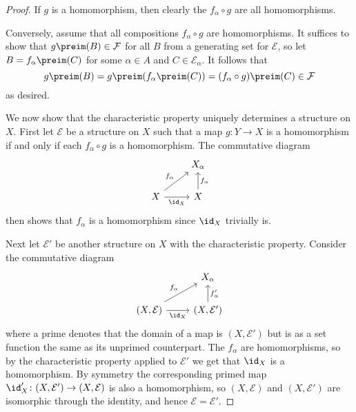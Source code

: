 \documentclass[article, a4paper, 11pt, oneside]{memoir}
\numberwithin{equation}{chapter}
\newcommand{\calE}{\mathcal{E}}
\newcommand{\calF}{\mathcal{F}}
\begin{document}
\begin{proof}
    If $g$ is a homomorphism, then clearly the $f_\alpha \circ g$ are all homomorphisms.

    Conversely, assume that all compositions $f_\alpha \circ g$ are homomorphisms. It suffices to show that $g\preim(B) \in \calF$ for all $B$ from a generating set for $\calE$, so let $B = f_\alpha\preim(C)$ for some $\alpha \in A$ and $C \in \calE_\alpha$. It follows that
    \begin{equation*}
        g\preim(B)
            = g\preim(f_\alpha\preim(C))
            = (f_\alpha \circ g)\preim(C)
            \in \calF
    \end{equation*}
    as desired.
    
    We now show that the characteristic property uniquely determines a structure on $X$. First let $\calE$ be a structure on $X$ such that a map $g \colon Y \to X$ is a homomorphism if and only if each $f_\alpha \circ g$ is a homomorphism. The commutative diagram
    \begin{equation*}
        \begin{tikzcd}
            & X_\alpha \\
            X
                \ar[r, "\id_X", swap]
                \ar[ur, "f_\alpha"]
            & X
                \ar[u, "f_\alpha", swap]
        \end{tikzcd}
    \end{equation*}
    then shows that $f_\alpha$ is a homomorphism since $\id_X$ trivially is.

    Next let $\calE'$ be another structure on $X$ with the characteristic property. Consider the commutative diagram
    \begin{equation*}
        \begin{tikzcd}
            & X_\alpha \\
            (X, \calE)
                \ar[r, "\id_X", swap]
                \ar[ur, "f_\alpha"]
            & (X, \calE')
                \ar[u, "f_\alpha'", swap]
        \end{tikzcd}
    \end{equation*}
    where a prime denotes that the domain of a map is $(X,\calE')$ but is as a set function the same as its unprimed counterpart. The $f_\alpha$ are homomorphisms, so by the characteristic property applied to $\calE'$ we get that $\id_X$ is a homomorphism. By symmetry the corresponding primed map $\id_X' \colon (X, \calE') \to (X, \calE)$ is also a homomorphism, so $(X,\calE)$ and $(X,\calE')$ are isomorphic through the identity, and hence $\calE = \calE'$.
\end{proof}
\end{document}
